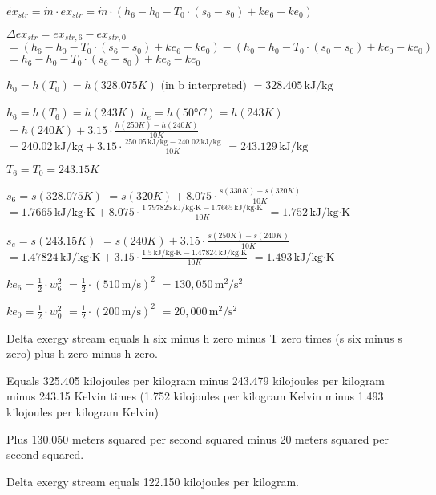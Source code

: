 \( \dot{ex}_{str} = \dot{m} \cdot ex_{str} = \dot{m} \cdot (h_6 - h_0 - T_0 \cdot (s_6 - s_0) + ke_6 + ke_0) \)  

\( \Delta ex_{str} = ex_{str,6} - ex_{str,0} \)  
\( = (h_6 - h_0 - T_0 \cdot (s_6 - s_0) + ke_6 + ke_0) - (h_0 - h_0 - T_0 \cdot (s_0 - s_0) + ke_0 - ke_0) \)  
\( = h_6 - h_0 - T_0 \cdot (s_6 - s_0) + ke_6 - ke_0 \)  

\( h_0 = h(T_0) = h(328.075K) \)  
\( \text{(in b interpreted)} \)  
\( = 328.405 \, \text{kJ/kg} \)  

\( h_6 = h(T_6) = h(243K) \)  
\( h_e = h(50°C) = h(243K) \)  
\( = h(240K) + 3.15 \cdot \frac{h(250K) - h(240K)}{10K} \)  
\( = 240.02 \, \text{kJ/kg} + 3.15 \cdot \frac{250.05 \, \text{kJ/kg} - 240.02 \, \text{kJ/kg}}{10K} \)  
\( = 243.129 \, \text{kJ/kg} \)  

\( T_6 = T_0 = 243.15K \)  

\( s_6 = s(328.075K) \)  
\( = s(320K) + 8.075 \cdot \frac{s(330K) - s(320K)}{10K} \)  
\( = 1.7665 \, \text{kJ/kg·K} + 8.075 \cdot \frac{1.797825 \, \text{kJ/kg·K} - 1.7665 \, \text{kJ/kg·K}}{10K} \)  
\( = 1.752 \, \text{kJ/kg·K} \)  

\( s_e = s(243.15K) \)  
\( = s(240K) + 3.15 \cdot \frac{s(250K) - s(240K)}{10K} \)  
\( = 1.47824 \, \text{kJ/kg·K} + 3.15 \cdot \frac{1.5 \, \text{kJ/kg·K} - 1.47824 \, \text{kJ/kg·K}}{10K} \)  
\( = 1.493 \, \text{kJ/kg·K} \)  

\( ke_6 = \frac{1}{2} \cdot w_6^2 \)  
\( = \frac{1}{2} \cdot (510 \, \text{m/s})^2 \)  
\( = 130,050 \, \text{m}^2/\text{s}^2 \)  

\( ke_0 = \frac{1}{2} \cdot w_0^2 \)  
\( = \frac{1}{2} \cdot (200 \, \text{m/s})^2 \)  
\( = 20,000 \, \text{m}^2/\text{s}^2 \)

Delta exergy stream equals h six minus h zero minus T zero times (s six minus s zero) plus h zero minus h zero.  

Equals 325.405 kilojoules per kilogram minus 243.479 kilojoules per kilogram minus 243.15 Kelvin times (1.752 kilojoules per kilogram Kelvin minus 1.493 kilojoules per kilogram Kelvin)  

Plus 130.050 meters squared per second squared minus 20 meters squared per second squared.  

Delta exergy stream equals 122.150 kilojoules per kilogram.